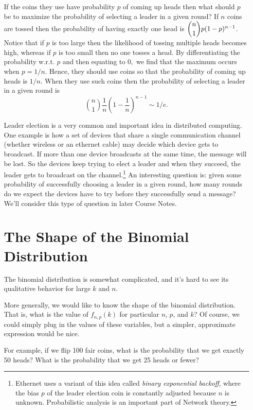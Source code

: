 \documentclass[11pt,twoside]{article}
\begin{document}
If the coins they use have probability $p$ of coming up heads then
what should $p$ be to maximize the probability of selecting a leader
in a given round? If $n$ coins are tossed then the probability of
having exactly one head is $\dbinom{n}{1} p(1-p)^{n-1}$. Notice that
if $p$ is too large then the likelihood of tossing multiple heads
becomes high, whereas if $p$ is too small then no one tosses a
head. By differentiating the probability w.r.t. $p$ and then equating
to $0,$ we find that the maximum occurs when $p = 1/n$. Hence, they
should use coins so that the probability of coming up heads is $1/n$.
When they use such coins then the probability of selecting a leader in
a given round is
\[
\binom{n}{1}\frac{1}{n}(1-\frac{1}{n})^{n-1} \sim 1/e.
\]

Leader election is a very common and important idea in distributed
computing. One example is how a set of devices that share a single
communication channel (whether wireless or an ethernet cable) may decide
which device gets to broadcast. If more than one device broadcasts at the
same time, the message will be lost. So the devices keep trying to elect a
leader and when they succeed, the leader gets to broadcast on the
channel.\footnote{Ethernet uses a variant of this idea called \emph{binary
exponential backoff}, where the bias $p$ of the leader election coin is
constantly adjusted because $n$ is unknown. Probabilistic analysis is an
important part of Network theory.} An interesting question is: given some
probability of successfully choosing a leader in a given round, how many
rounds do we expect the devices have to try before they successfully send
a message?  We'll consider this type of question in later Course Notes.


\section{The Shape of the Binomial Distribution}

The binomial distribution is somewhat complicated, and it's hard to see
its qualitative behavior for large $k$ and $n$.

\iffalse

More generally, we would like to know the shape of the binomial
distribution.  That is, what is the value of $f_{n, p}(k)$ for
particular $n$, $p$, and $k$?  Of course, we could simply plug in the
values of these variables, but a simpler, approximate expression would
be nice.

For example, if we flip 100 fair coins, what is the probability that
we get exactly 50 heads?  What is the probability that we get 25 heads
or fewer?
\end{document}
